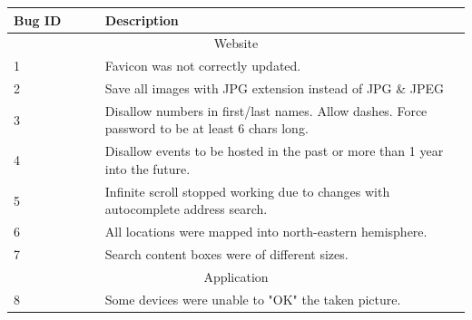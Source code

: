 \begin{tabular}{|p{0.2\linewidth} p{0.8\linewidth}|}
\hline
\cellcolor{gray!25} \textbf{Bug ID} & \cellcolor{gray!25} \textbf{Description} \\
\hline
\multicolumn{2}{|c|}{\cellcolor{gray!25} Website} \\
1 & Favicon was not correctly updated. \\
2 & Save all images with JPG extension instead of JPG \& JPEG \\
3 & Disallow numbers in first/last names. Allow dashes. Force password to be at least 6 chars long. \\
4 & Disallow events to be hosted in the past or more than 1 year into the future. \\
5 & Infinite scroll stopped working due to changes with autocomplete address search. \\
6 & All locations were mapped into north-eastern hemisphere. \\
7 & Search content boxes were of different sizes. \\
\multicolumn{2}{|c|}{\cellcolor{gray!25} Application} \\
8 & Some devices were unable to "OK" the taken picture.
\end{tabular}
